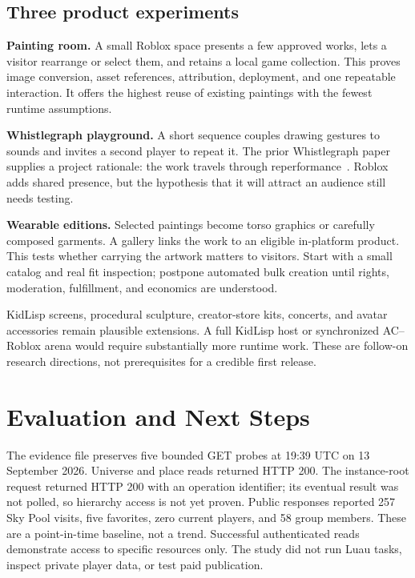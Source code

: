 \documentclass[10pt,letterpaper,twocolumn]{article}
\begin{document}
\subsection{Three product experiments}
\textbf{Painting room.} A small Roblox space presents a few approved works, lets a visitor rearrange or select them, and retains a local game collection. This proves image conversion, asset references, attribution, deployment, and one repeatable interaction. It offers the highest reuse of existing paintings with the fewest runtime assumptions.

\textbf{Whistlegraph playground.} A short sequence couples drawing gestures to sounds and invites a second player to repeat it. The prior Whistlegraph paper supplies a project rationale: the work travels through reperformance~\cite{whistlegraph}. Roblox adds shared presence, but the hypothesis that it will attract an audience still needs testing.

\textbf{Wearable editions.} Selected paintings become torso graphics or carefully composed garments. A gallery links the work to an eligible in-platform product. This tests whether carrying the artwork matters to visitors. Start with a small catalog and real fit inspection; postpone automated bulk creation until rights, moderation, fulfillment, and economics are understood.

KidLisp screens, procedural sculpture, creator-store kits, concerts, and avatar accessories remain plausible extensions. A full KidLisp host or synchronized AC--Roblox arena would require substantially more runtime work. These are follow-on research directions, not prerequisites for a credible first release.

\section{Evaluation and Next Steps}
The evidence file preserves five bounded GET probes at 19:39 UTC on 13 September 2026. Universe and place reads returned HTTP 200. The instance-root request returned HTTP 200 with an operation identifier; its eventual result was not polled, so hierarchy access is not yet proven. Public responses reported 257 Sky Pool visits, five favorites, zero current players, and 58 group members. These are a point-in-time baseline, not a trend. Successful authenticated reads demonstrate access to specific resources only. The study did not run Luau tasks, inspect private player data, or test paid publication.
\end{document}
